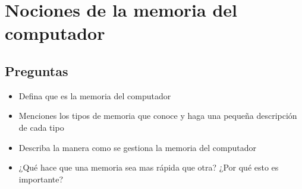 \section{Nociones de la memoria del computador}
\subsection{Preguntas}
\begin{itemize}
    \item Defina que es la memoria del computador
    \item Menciones los tipos de memoria que conoce y haga una pequeña descripción de cada tipo
    \item Describa la manera como se gestiona la memoria del computador
    \item ¿Qué hace que una memoria sea mas rápida que otra? ¿Por qué esto es importante?
\end{itemize}

\newpage

